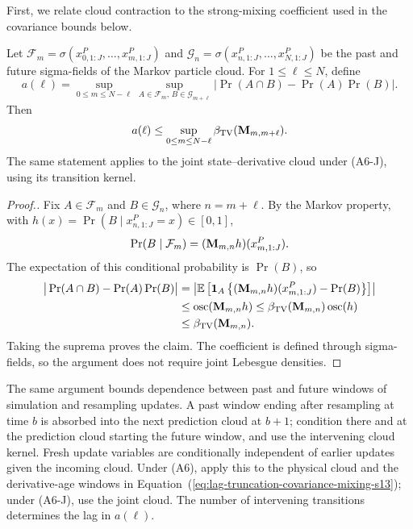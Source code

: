 First, we relate cloud contraction to the strong-mixing coefficient used
in the covariance bounds below.
\begin{lem}
\label{lem:dobrushin-implies-alpha-mixing}
Let $\mathcal F_m=\sigma(x_{0,1:J}^P,\ldots,x_{m,1:J}^P)$ and
$\mathcal G_n=\sigma(x_{n,1:J}^P,\ldots,x_{N,1:J}^P)$ be the past and
future sigma-fields of the Markov particle cloud. For $1\leq\ell\leq N$, define
\begin{equation}
a(\ell)=\sup_{0\leq m\leq N-\ell}
\sup_{A\in\mathcal F_m,\,B\in\mathcal G_{m+\ell}}
\big|\Pr(A\cap B)-\Pr(A)\Pr(B)\big|.
\end{equation}
Then
\begin{equation}
a(\ell)\leq\sup_{0\leq m\leq N-\ell}
\beta_{\mathrm{TV}}(\textbf M_{m,m+\ell}).
\end{equation}
The same statement applies to the joint state--derivative cloud under
(A6-J), using its transition kernel.
\end{lem}
\begin{proof}[Proof.]
Fix $A\in\mathcal F_m$ and $B\in\mathcal G_n$, where $n=m+\ell$.
By the Markov property, with
$h(x)=\Pr(B\mid x_{n,1:J}^P=x)\in[0,1]$,
\begin{equation}
\Pr(B\mid\mathcal F_m)
=(\textbf M_{m,n}h)(x_{m,1:J}^P).
\end{equation}
The expectation of this conditional probability is $\Pr(B)$, so
\begin{align}
\big|\Pr(A\cap B)-\Pr(A)\Pr(B)\big|
&=\left|\mathbb{E}\left[\mathbf1_A
\left\{(\textbf M_{m,n}h)(x_{m,1:J}^P)-\Pr(B)\right\}\right]\right|
\notag\\*
&\leq\operatorname{osc}(\textbf M_{m,n}h)
\leq\beta_{\mathrm{TV}}(\textbf M_{m,n})\operatorname{osc}(h)
\notag\\*
&\leq\beta_{\mathrm{TV}}(\textbf M_{m,n}).
\end{align}
Taking the suprema proves the claim. The coefficient is defined through
sigma-fields, so the argument does not require joint Lebesgue densities.
\end{proof}
The same argument bounds dependence between past and future windows of
simulation and resampling updates. A past window ending after resampling
at time $b$ is absorbed into the next prediction cloud at $b+1$; condition
there and at the prediction cloud starting the future window, and use
the intervening cloud kernel. Fresh update variables are conditionally independent of earlier
updates given the incoming cloud. Under (A6), apply this to the physical
cloud and the derivative-age windows in
Equation~(\ref{eq:lag-truncation-covariance-mixing-s13}); under (A6-J),
use the joint cloud. The number of intervening transitions determines
the lag in $a(\ell)$.

